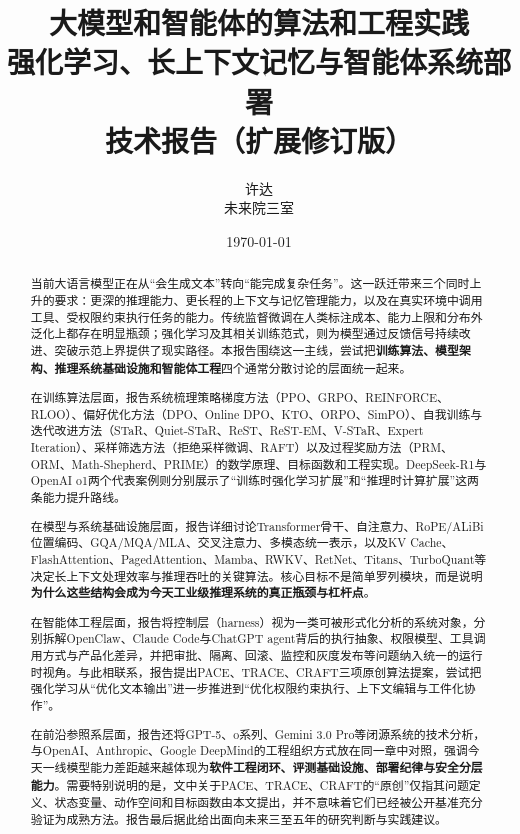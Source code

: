 \documentclass[12pt,a4paper]{article}
\title{\textbf{大模型和智能体的算法和工程实践}\\[0.5cm]
\Large 强化学习、长上下文记忆与智能体系统部署\\[0.3cm]
\large 技术报告（扩展修订版）}
\author{许达\\未来院三室}
\date{\today}
\begin{document}
\maketitle

\begin{abstract}
当前大语言模型正在从“会生成文本”转向“能完成复杂任务”。这一跃迁带来三个同时上升的要求：更深的推理能力、更长程的上下文与记忆管理能力，以及在真实环境中调用工具、受权限约束执行任务的能力。传统监督微调在人类标注成本、能力上限和分布外泛化上都存在明显瓶颈；强化学习及其相关训练范式，则为模型通过反馈信号持续改进、突破示范上界提供了现实路径。本报告围绕这一主线，尝试把\textbf{训练算法、模型架构、推理系统基础设施和智能体工程}四个通常分散讨论的层面统一起来。

在训练算法层面，报告系统梳理策略梯度方法（PPO、GRPO、REINFORCE、RLOO）、偏好优化方法（DPO、Online DPO、KTO、ORPO、SimPO）、自我训练与迭代改进方法（STaR、Quiet-STaR、ReST、ReST-EM、V-STaR、Expert Iteration）、采样筛选方法（拒绝采样微调、RAFT）以及过程奖励方法（PRM、ORM、Math-Shepherd、PRIME）的数学原理、目标函数和工程实现。DeepSeek-R1与OpenAI o1两个代表案例则分别展示了“训练时强化学习扩展”和“推理时计算扩展”这两条能力提升路线。

在模型与系统基础设施层面，报告详细讨论Transformer骨干、自注意力、RoPE/ALiBi位置编码、GQA/MQA/MLA、交叉注意力、多模态统一表示，以及KV Cache、FlashAttention、PagedAttention、Mamba、RWKV、RetNet、Titans、TurboQuant等决定长上下文处理效率与推理吞吐的关键算法。核心目标不是简单罗列模块，而是说明\textbf{为什么这些结构会成为今天工业级推理系统的真正瓶颈与杠杆点}。

在智能体工程层面，报告将控制层（harness）视为一类可被形式化分析的系统对象，分别拆解OpenClaw、Claude Code与ChatGPT agent背后的执行抽象、权限模型、工具调用方式与产品化差异，并把审批、隔离、回滚、监控和灰度发布等问题纳入统一的运行时视角。与此相联系，报告提出PACE、TRACE、CRAFT三项原创算法提案，尝试把强化学习从“优化文本输出”进一步推进到“优化权限约束执行、上下文编辑与工件化协作”。

在前沿参照系层面，报告还将GPT-5、o系列、Gemini 3.0 Pro等闭源系统的技术分析，与OpenAI、Anthropic、Google DeepMind的工程组织方式放在同一章中对照，强调今天一线模型能力差距越来越体现为\textbf{软件工程闭环、评测基础设施、部署纪律与安全分层能力}。需要特别说明的是，文中关于PACE、TRACE、CRAFT的“原创”仅指其问题定义、状态变量、动作空间和目标函数由本文提出，并不意味着它们已经被公开基准充分验证为成熟方法。报告最后据此给出面向未来三至五年的研究判断与实践建议。
\end{abstract}

\tableofcontents
\newpage
\end{document}
